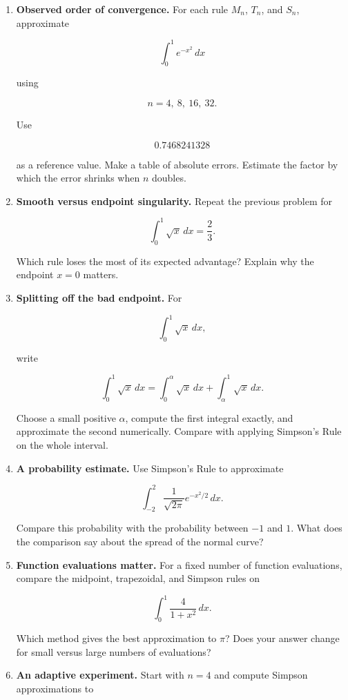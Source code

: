 \begin{enumerate}
\item \textbf{Observed order of convergence.}
For each rule \(M_n\), \(T_n\), and \(S_n\), approximate

\[
\int_0^1 e^{-x^2}\,dx
\]

using

\[
n=4,\ 8,\ 16,\ 32.
\]

Use

\[
0.7468241328
\]

as a reference value.  Make a table of absolute errors.  Estimate the factor by which
the error shrinks when \(n\) doubles.

\item \textbf{Smooth versus endpoint singularity.}
Repeat the previous problem for

\[
\int_0^1 \sqrt{x}\,dx=\frac23.
\]

Which rule loses the most of its expected advantage?  Explain why the endpoint
\(x=0\) matters.

\item \textbf{Splitting off the bad endpoint.}
For

\[
\int_0^1 \sqrt{x}\,dx,
\]

write

\[
\int_0^1 \sqrt{x}\,dx
=
\int_0^\alpha \sqrt{x}\,dx+\int_\alpha^1 \sqrt{x}\,dx.
\]

Choose a small positive \(\alpha\), compute the first integral exactly, and approximate
the second numerically.  Compare with applying Simpson's Rule on the whole interval.

\item \textbf{A probability estimate.}
Use Simpson's Rule to approximate

\[
\int_{-2}^{2}\frac1{\sqrt{2\pi}}e^{-x^2/2}\,dx.
\]

Compare this probability with the probability between \(-1\) and \(1\).  What does the
comparison say about the spread of the normal curve?

\item \textbf{Function evaluations matter.}
For a fixed number of function evaluations, compare the midpoint, trapezoidal, and
Simpson rules on

\[
\int_0^1 \frac{4}{1+x^2}\,dx.
\]

Which method gives the best approximation to \(\pi\)?  Does your answer change for
small versus large numbers of evaluations?

\item \textbf{An adaptive experiment.}
Start with \(n=4\) and compute Simpson approximations to


\end{enumerate}
